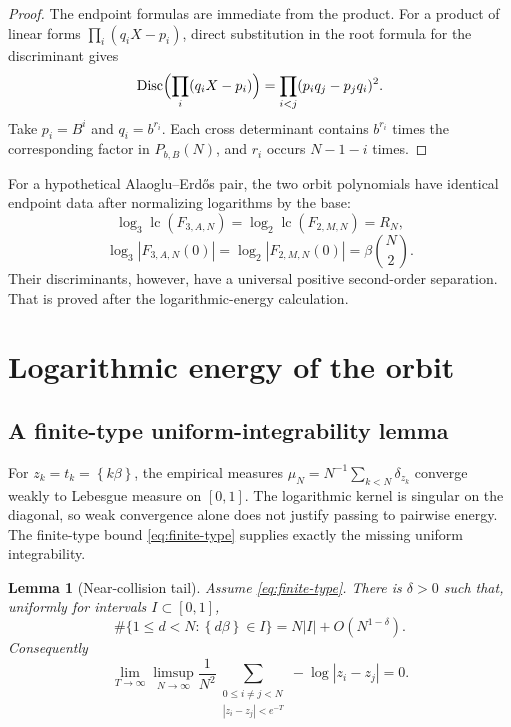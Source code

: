 \documentclass[11pt,oneside]{article}
\newtheorem{lemma}[theorem]{Lemma}
\theoremstyle{definition}
\theoremstyle{remark}
\newcommand{\fract}[1]{\left\{#1\right\}}
\begin{document}
\begin{proof}
The endpoint formulas are immediate from the product.  For a product of linear forms
$\prod_i(q_iX-p_i)$, direct substitution in the root formula for the discriminant gives
\[
 \operatorname{Disc}\Bigl(\prod_i(q_iX-p_i)\Bigr)
 =\prod_{i<j}(p_iq_j-p_jq_i)^2.
\]
Take $p_i=B^i$ and $q_i=b^{r_i}$.  Each cross determinant contains $b^{r_i}$ times the
corresponding factor in $P_{b,B}(N)$, and $r_i$ occurs $N-1-i$ times.
\end{proof}

For a hypothetical Alaoglu--Erd\H{o}s pair, the two orbit polynomials have identical endpoint
data after normalizing logarithms by the base:
\begin{equation}
 \log_3\operatorname{lc}(F_{3,A,N})
 =\log_2\operatorname{lc}(F_{2,M,N})=R_N,
 \label{eq:lc-match}
\end{equation}
\begin{equation}
 \log_3|F_{3,A,N}(0)|
 =\log_2|F_{2,M,N}(0)|
 =\beta\binom N2.
 \label{eq:ct-match}
\end{equation}
Their discriminants, however, have a universal positive second-order separation.  That is
proved after the logarithmic-energy calculation.

\section{Logarithmic energy of the orbit}
\label{sec:energy}

\subsection{A finite-type uniform-integrability lemma}

For $z_k=t_k=\fract{k\beta}$, the empirical measures
$\mu_N=N^{-1}\sum_{k<N}\delta_{z_k}$ converge weakly to Lebesgue measure on $[0,1]$.
The logarithmic kernel is singular on the diagonal, so weak convergence alone does not justify
passing to pairwise energy.  The finite-type bound \eqref{eq:finite-type} supplies exactly the
missing uniform integrability.

\begin{lemma}[Near-collision tail]
\label{lem:near-tail}
Assume \eqref{eq:finite-type}.  There is $\delta>0$ such that, uniformly for intervals
$I\subset[0,1]$,
\begin{equation}
 \#\{1\le d<N:\fract{d\beta}\in I\}
 =N|I|+O(N^{1-\delta}).
 \label{eq:discrepancy}
\end{equation}
Consequently
\begin{equation}
 \lim_{T\to\infty}\limsup_{N\to\infty}
 \frac1{N^2}\sum_{\substack{0\le i\ne j<N\\|z_i-z_j|<e^{-T}}}
 -\log|z_i-z_j|=0.
 \label{eq:UI}
\end{equation}
\end{lemma}
\end{document}
